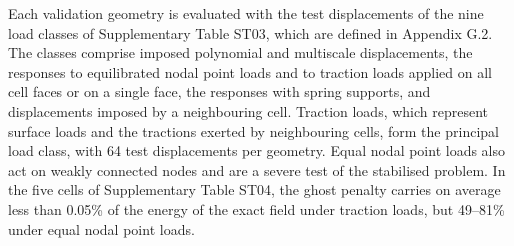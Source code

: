 \documentclass[preprint,12pt,authoryear]{elsarticle}
\begin{document}
Each validation geometry is evaluated with the test displacements of the nine load classes of Supplementary Table ST03, which are defined in Appendix G.2. The classes comprise imposed polynomial and multiscale displacements, the responses to equilibrated nodal point loads and to traction loads applied on all cell faces or on a single face, the responses with spring supports, and displacements imposed by a neighbouring cell. Traction loads, which represent surface loads and the tractions exerted by neighbouring cells, form the principal load class, with 64 test displacements per geometry. Equal nodal point loads also act on weakly connected nodes and are a severe test of the stabilised problem. In the five cells of Supplementary Table ST04, the ghost penalty carries on average less than 0.05\% of the energy of the exact field under traction loads, but 49--81\% under equal nodal point loads.
\end{document}
